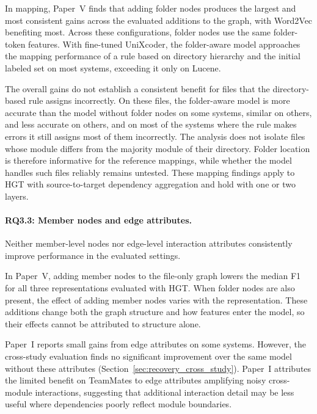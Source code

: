 In mapping, Paper~V finds that adding folder nodes produces the largest and most consistent gains across the evaluated additions to the graph, with Word2Vec benefiting most. Across these configurations, folder nodes use the same folder-token features. With fine-tuned UniXcoder, the folder-aware model approaches the mapping performance of a rule based on directory hierarchy and the initial labeled set on most systems, exceeding it only on Lucene.

The overall gains do not establish a consistent benefit for files that the directory-based rule assigns incorrectly. On these files, the folder-aware model is more accurate than the model without folder nodes on some systems, similar on others, and less accurate on others, and on most of the systems where the rule makes errors it still assigns most of them incorrectly. The analysis does not isolate files whose module differs from the majority module of their directory. Folder location is therefore informative for the reference mappings, while whether the model handles such files reliably remains untested. These mapping findings apply to HGT with source-to-target dependency aggregation and hold with one or two layers.

\paragraph{RQ3.3: Member nodes and edge attributes.} Neither member-level nodes nor edge-level interaction attributes consistently improve performance in the evaluated settings.

In Paper~V, adding member nodes to the file-only graph lowers the median F1 for all three representations evaluated with HGT. When folder nodes are also present, the effect of adding member nodes varies with the representation. These additions change both the graph structure and how features enter the model, so their effects cannot be attributed to structure alone.

Paper~I reports small gains from edge attributes on some systems. However, the cross-study evaluation finds no significant improvement over the same model without these attributes (Section~\ref{sec:recovery_cross_study}). Paper~I attributes the limited benefit on TeamMates to edge attributes amplifying noisy cross-module interactions, suggesting that additional interaction detail may be less useful where dependencies poorly reflect module boundaries.

